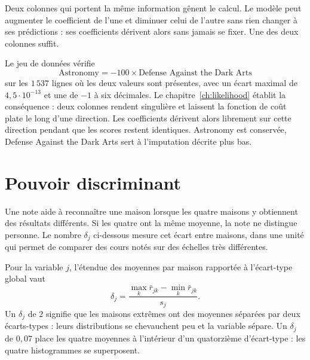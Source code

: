 \begin{lecture}
Deux colonnes qui portent la même information gênent le calcul. Le modèle peut
augmenter le coefficient de l'une et diminuer celui de l'autre sans rien changer
à ses prédictions : ses coefficients dérivent alors sans jamais se fixer. Une des
deux colonnes suffit.
\end{lecture}

Le jeu de données vérifie
\[
  \text{Astronomy}=-100\times\text{Defense Against the Dark Arts}
\]
sur les $1\,537$ lignes où les deux valeurs sont présentes, avec un écart maximal
de $4{,}5\cdot10^{-13}$ et une  de $-1$ à six décimales. Le
chapitre~\ref{ch:likelihood} établit la conséquence : deux colonnes
 rendent  singulière et laissent la fonction de coût
plate le long d'une direction. Les coefficients dérivent alors librement sur
cette direction pendant que les scores restent identiques. Astronomy est
conservée, Defense Against the Dark Arts sert à l'imputation décrite plus bas.

\section{Pouvoir discriminant}
\label{sec:discriminant}

\begin{lecture}
Une note aide à reconnaître une maison lorsque les quatre maisons y obtiennent
des résultats différents. Si les quatre ont la même moyenne, la note ne distingue
personne. Le nombre $\delta_j$ ci-dessous mesure cet écart entre maisons, dans
une unité qui permet de comparer des cours notés sur des échelles très
différentes.
\end{lecture}

Pour la variable $j$, l'étendue des moyennes par maison rapportée à l'écart-type
global vaut
\[
  \delta_j=\frac{\max_k\bar r_{jk}-\min_k\bar r_{jk}}{s_j}.
\]
Un $\delta_j$ de $2$ signifie que les maisons extrêmes ont des moyennes séparées
par deux écarts-types : leurs distributions se chevauchent peu et la variable
sépare. Un $\delta_j$ de $0{,}07$ place les quatre moyennes à l'intérieur d'un
quatorzième d'écart-type : les quatre histogrammes se superposent.

